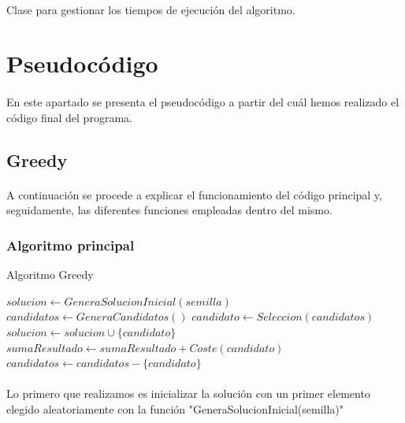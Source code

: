 \documentclass{article}
\begin{document}
	\paragraph{}Clase para gestionar los tiempos de ejecución del algoritmo.
	
	\section{Pseudocódigo}
	
	\paragraph{}En este apartado se presenta el pseudocódigo a partir del cuál hemos realizado el código final del programa.
	
	\subsection{Greedy}
	
	\paragraph{}A continuación se procede a explicar el funcionamiento del código principal y, seguidamente, las diferentes funciones empleadas dentro del mismo.
	
	\subsubsection{Algoritmo principal}
	\begin{algorithm}[H]
		\caption{Algoritmo Greedy}
		\begin{algorithmic}
			\STATE $solucion \leftarrow GeneraSolucionInicial(semilla)$
			\STATE $candidatos \leftarrow GeneraCandidatos()$
			\STATE $candidato \leftarrow Seleccion(candidatos)$
			\STATE $solucion \leftarrow solucion \cup \{candidato\}$
			\STATE $sumaResultado \leftarrow sumaResultado + Coste(candidato)$
			\ENDIF
			\STATE $candidatos \leftarrow candidatos - \{ candidato \}$
			\ENDWHILE
		\end{algorithmic}
	\end{algorithm}
	
	\paragraph{}Lo primero que realizamos es inicializar la solución con un primer elemento elegido aleatoriamente con la función "GeneraSolucionInicial(semilla)"
	
\end{document}
